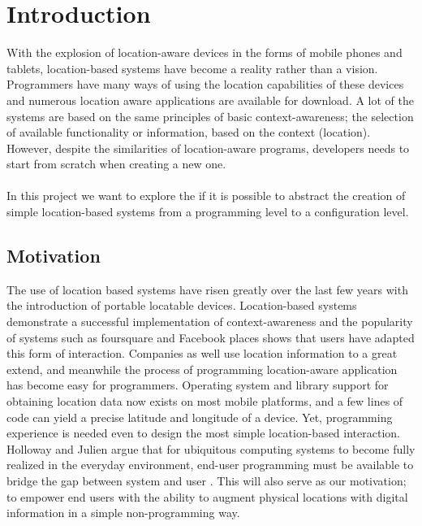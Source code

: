
\section{Introduction}
\label{sec.introduction}

With the explosion of location-aware devices in the forms of mobile phones and tablets, location-based systems have become a reality rather than a vision. Programmers have many ways of using the location capabilities of these devices and numerous location aware applications are available for download. A lot of the systems are based on the same principles of basic context-awareness; the selection of available functionality or information, based on the context (location). However, despite the similarities of location-aware programs, developers needs to start from scratch when creating a new one. 
\\\\
In this project we want to explore the if it is possible to abstract the creation of simple location-based systems from a programming level to a configuration level.


\subsection{Motivation} %
\label{sub:context_and_motivation}
The use of location based systems have risen greatly over the last few years with the introduction of portable locatable devices. Location-based systems demonstrate a successful implementation of context-awareness and the popularity of systems such as foursquare and Facebook places shows that users have adapted this form of interaction. Companies as well use location information to a great extend, and meanwhile the process of programming location-aware application has become easy for programmers. Operating system and library support for obtaining location data now exists on most mobile platforms, and a few lines of code can yield a precise latitude and longitude of a device. Yet, programming experience is needed even to design the most simple location-based interaction. Holloway and Julien argue that for ubiquitous computing systems to become fully realized in the everyday environment, end-user programming must be available to bridge the gap between system and user \cite{Holloway:2010:CEP:1882362.1882398}. This will also serve as our motivation; to empower end users with the ability to augment physical locations with digital information in a simple non-programming way.


